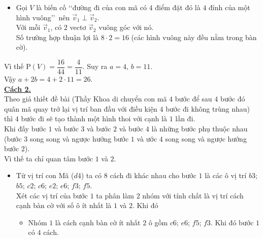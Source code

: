 \begin{ex}
{\begin{itemize}
\begin{center}
		\end{center}
		Loại $4$ trường hợp đi chệch khỏi bàn cờ (khi $|x_1+x_2|=4$ hoặc $|y_1+y_2|=4$), ta có $n(\Omega)=48-4=44$.
		\item Gọi $V$ là biến cố \lq\lq đường đi của con mã có $4$ điểm đặt đó là $4$ đỉnh của một hình vuông\rq\rq\ nên $\overrightarrow{v}_1 \perp \overrightarrow{v}_2$. \\
		Với mỗi $\overrightarrow{v}_1$, có $2$ vectơ $\overrightarrow{v}_2$ vuông góc với nó. \\
		Số trường hợp thuận lợi là $8\cdot2=16$ (các hình vuông này đều nằm trong bàn cờ).
	\end{itemize}
	Vì thế $\mathrm{P}(V)=\dfrac{16}{44}=\dfrac{4}{11}$.
	Suy ra $a=4$, $b=11$.\\
	Vậy $a+2b=4+2\cdot11=26$.\\
	\underline{\textbf{Cách 2.}}\\
	Theo giả thiết đề bài (Thầy Khoa di chuyển con mã $4$ bước để sau $4$ bước đó quân mã quay trở lại vị trí ban đầu với điều kiện $4$ bước đi không trùng nhau) thì $4$ bước đi sẽ tạo thành một hình thoi với cạnh là $1$ lần đi.\\
	Khi đấy bước $1$ và bước $3$ và bước $2$ và bước $4$ là những bước phụ thuộc nhau (bước $3$ song song và ngược hướng bước $1$ và ước $4$ song song và ngược hướng bước $2$).\\
	Vì thế ta chỉ quan tâm bước $1$ và $2$.
	\begin{itemize}
		\item Từ vị trí con Mã ($d4$) ta có $8$ cách đi khác nhau cho bước $1$ là các ô vị trí $b3$; $b5$; $c2$; $c6$; $e2$; $e6$; $f3$; $f5$.\\
		Xét các vị trí của bước $1$ ta phân làm $2$ nhóm với tính chất là vị trí cách cạnh bàn cờ với số ô ít nhất là $1$ và $2$. Khi đó
		\begin{itemize}
			\item Nhóm $1$ là cách cạnh bàn cờ ít nhất $2$ ô gồm $c6$; $e6$; $f5$; $f3$. Khi đó bước $1$ có $4$ cách.\\

\end{itemize}
\end{itemize}}
\end{ex}
